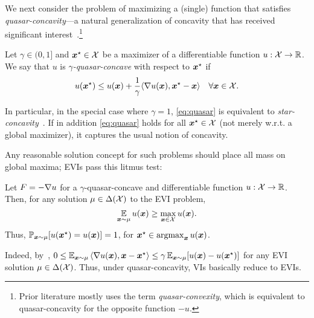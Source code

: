 We next consider the problem of maximizing a (single) function that satisfies \emph{quasar-concavity}---a natural generalization of concavity that has received significant  interest~\citep{Hardt18:Gradient,Fu23:Accelerated,Hinder20:Near,Gower21:SGD,Guminov23:Accelerated,Caramanis24:Optimizing}.\footnote{Prior literature mostly uses the term \emph{quasar-convexity}, which is equivalent to quasar-concavity for the opposite function $-u$.}

\begin{definition}
    \label{def:quasar}
    Let $\gamma \in (0, 1]$ and ${\bm{x}}^\star \in {\mathcal{X}}$ be a maximizer of a differentiable function $u : {\mathcal{X}} \to \mathbb R$. We say that $u$ is \emph{$\gamma$-quasar-concave} with respect to ${\bm{x}}^\star$ if
    \begin{equation}
        \label{eq:quasar}
        u({\bm{x}}^\star) \leq u({\bm{x}}) + \frac{1}{\gamma} \langle \nabla u({\bm{x}}), {\bm{x}}^\star - {\bm{x}} \rangle \quad \forall {\bm{x}} \in {\mathcal{X}}.
    \end{equation}
\end{definition}

In particular, in the special case where $\gamma = 1$, \eqref{eq:quasar} is equivalent to \emph{star-concavity}~\citep{Nesterov06:Cubic}. If in addition \eqref{eq:quasar} holds for all ${\bm{x}}^\star \in {\mathcal{X}}$ (not merely w.r.t. a global maximizer), it captures the usual notion of concavity.

Any reasonable solution concept for such problems should place all mass on global maxima; EVIs pass this litmus test:

\begin{proposition}
    \label{prop:convex-equiv}
    Let $F = - \nabla u$ for a $\gamma$-quasar-concave and differentiable function $u : {\mathcal{X}} \to \mathbb R$. Then, for any solution $\mu \in \Delta({\mathcal{X}})$ to the EVI problem,
    \begin{equation*}
        \operatorname*{\mathbb E}_{{\bm{x}} \sim \mu} u({\bm{x}}) \geq \max_{{\bm{x}} \in {\mathcal{X}}} u({\bm{x}}).
    \end{equation*}
    Thus, $\mathbb{P}_{{\bm{x}}\sim\mu}[u({\bm{x}}^\star) = u({\bm{x}})] = 1$, for ${\bm{x}}^\star \in \operatorname*{argmax}_{{\bm{x}}} u({\bm{x}})$.
\end{proposition}

Indeed, by~, $0 \leq \E_{\vx\sim\mu} \ip{\grad u(\vx), \vx - \vxstar } \le \gamma \E_{\vx\sim\mu} [u(\vx) - u(\vxstar) ]$ for any EVI solution $\mu \in \Delta({\mathcal{X}})$. Thus, under quasar-concavity, VIs basically reduce to EVIs.



